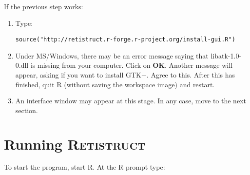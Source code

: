 \documentclass{article}
\begin{document}
If the previous step works:
\begin{enumerate}
\item Type:
\begin{verbatim}
source("http://retistruct.r-forge.r-project.org/install-gui.R")
\end{verbatim}
\item Under MS/Windows, there may be an  error message saying that
  libatk-1.0-0.dll is missing from your computer. Click on
  \textbf{OK}. Another message will appear, asking if you want to
  install GTK+. Agree to this.  After this has finished, quit R
  (without saving the workspace image) and restart.
\item An interface window may appear at this stage. In any case, move
  to the next section.
\end{enumerate}




\section{Running \textsc{Retistruct}}
\label{manual:sec:running}

To start the program, start \textsc{R}. At the \textsc{R} prompt type:
\end{document}
